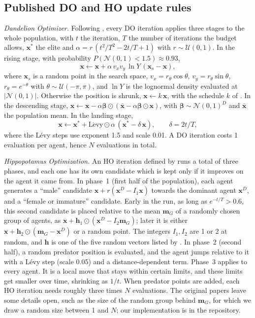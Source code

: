 \documentclass[pdflatex,sn-basic]{sn-jnl}
\begin{document}
\subsection{Published DO and HO update rules}
\emph{Dandelion Optimizer.} Following \citet{zhao2022do}, every DO iteration applies three stages to the whole population, with $t$ the iteration, $T$ the number of iterations the budget allows, $\mathbf{x}^\ast$ the elite and $\alpha=r\,(t^2/T^2-2t/T+1)$ with $r\sim\mathcal{U}(0,1)$. In the rising stage, with probability $P(\mathcal{N}(0,1)<1.5)\approx0.93$,
\begin{equation}
\mathbf{x}\leftarrow\mathbf{x}+\alpha\,v_xv_y\,\ln Y\,(\mathbf{x}_s-\mathbf{x}),
\end{equation}
where $\mathbf{x}_s$ is a random point in the search space, $v_x=r_\theta\cos\theta$, $v_y=r_\theta\sin\theta$, $r_\theta=e^{-\theta}$ with $\theta\sim\mathcal{U}(-\pi,\pi)$, and $\ln Y$ is the lognormal density evaluated at $|\mathcal{N}(0,1)|$. Otherwise the position is shrunk, $\mathbf{x}\leftarrow k\,\mathbf{x}$, with the schedule $k$ of \citet{zhao2022do}. In the descending stage, $\mathbf{x}\leftarrow\mathbf{x}-\alpha\boldsymbol{\beta}\odot(\bar{\mathbf{x}}-\alpha\boldsymbol{\beta}\odot\mathbf{x})$, with $\boldsymbol{\beta}\sim\mathcal{N}(0,1)^D$ and $\bar{\mathbf{x}}$ the population mean. In the landing stage,
\begin{equation}
\mathbf{x}\leftarrow\mathbf{x}^\ast+\mathrm{L\acute{e}vy}\odot\alpha\,(\mathbf{x}^\ast-\delta\,\mathbf{x}),\qquad \delta=2t/T,
\end{equation}
where the Lévy steps use exponent 1.5 and scale 0.01. A DO iteration costs 1 evaluation per agent, hence $N$ evaluations in total.

\emph{Hippopotamus Optimization.} An HO iteration defined by \citet{amiri2024ho} runs a total of three phases, and each one has its own candidate which is kept only if it improves on the agent it came from. In phase~1 (first half of the population), each agent generates a ``male'' candidate $\mathbf{x}+r(\mathbf{x}^{D}-I_1\mathbf{x})$ towards the dominant agent $\mathbf{x}^{D}$, and a ``female or immature'' candidate. Early in the run, as long as $e^{-t/T}>0.6$, this second candidate is placed relative to the mean $\mathbf{m}_G$ of a randomly chosen group of agents, as $\mathbf{x}+\mathbf{h}_1\odot(\mathbf{x}^{D}-I_2\mathbf{m}_G)$; later it is either $\mathbf{x}+\mathbf{h}_2\odot(\mathbf{m}_G-\mathbf{x}^{D})$ or a random point. The integers $I_1,I_2$ are 1 or 2 at random, and $\mathbf{h}$ is one of the five random vectors listed by \citet{amiri2024ho}. In phase~2 (second half), a random predator position is evaluated, and the agent jumps relative to it with a Lévy step (scale 0.05) and a distance-dependent term. Phase~3 applies to every agent. It is a local move that stays within certain limits, and these limits get smaller over time, shrinking as $1/t$. When predator points are added, each HO iteration needs roughly three times $N$ evaluations. The original papers leave some details open, such as the size of the random group behind $\mathbf{m}_G$, for which we draw a random size between 1 and $N$; our implementation is in the repository.
\end{document}
